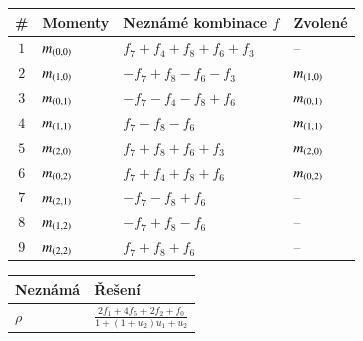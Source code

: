 \begin{table}[!h]
	\centering
	\begin{tabular}{c l l l}
		\toprule
		\# & Momenty & Neznámé kombinace $f$ & Zvolené\\
		\midrule
		\multirow{ 1}{*}{$1$} & \multirow{ 1}{*}{$m_{\left(0,0\right)}$} & $f_7+f_4+f_8+f_6+f_3$ & \multirow{ 1}{*}{--}\\ 
		\midrule
		\multirow{ 1}{*}{$2$} & \multirow{ 1}{*}{$m_{\left(1,0\right)}$} & $-f_7+f_8-f_6-f_3$ & \multirow{ 1}{*}{$m_{\left(1,0\right)}$}\\ 
		\midrule
		\multirow{ 1}{*}{$3$} & \multirow{ 1}{*}{$m_{\left(0,1\right)}$} & $-f_7-f_4-f_8+f_6$ & \multirow{ 1}{*}{$m_{\left(0,1\right)}$}\\ 
		\midrule
		\multirow{ 1}{*}{$4$} & \multirow{ 1}{*}{$m_{\left(1,1\right)}$} & $f_7-f_8-f_6$ & \multirow{ 1}{*}{$m_{\left(1,1\right)}$}\\ 
		\midrule
		\multirow{ 1}{*}{$5$} & \multirow{ 1}{*}{$m_{\left(2,0\right)}$} & $f_7+f_8+f_6+f_3$ & \multirow{ 1}{*}{$m_{\left(2,0\right)}$}\\ 
		\midrule
		\multirow{ 1}{*}{$6$} & \multirow{ 1}{*}{$m_{\left(0,2\right)}$} & $f_7+f_4+f_8+f_6$ & \multirow{ 1}{*}{$m_{\left(0,2\right)}$}\\ 
		\midrule
		\multirow{ 1}{*}{$7$} & \multirow{ 1}{*}{$m_{\left(2,1\right)}$} & $-f_7-f_8+f_6$ & \multirow{ 1}{*}{--}\\ 
		\midrule
		\multirow{ 1}{*}{$8$} & \multirow{ 1}{*}{$m_{\left(1,2\right)}$} & $-f_7+f_8-f_6$ & \multirow{ 1}{*}{--}\\ 
		\midrule
		\multirow{ 1}{*}{$9$} & \multirow{ 1}{*}{$m_{\left(2,2\right)}$} & $f_7+f_8+f_6$ & \multirow{ 1}{*}{--}\\ 
		\bottomrule
\end{tabular}\end{table}

\begin{table}[!h]
	\centering
	\begin{tabular}{l l}
		\toprule
		Neznámá & Řešení\\
		\midrule
		$\rho$ & $\frac{2 f_1+4 f_5+2 f_2+f_0}{1+ {(1+u_2)} u_1 +u_2}$ \\ 
		\bottomrule
\end{tabular}\end{table}

